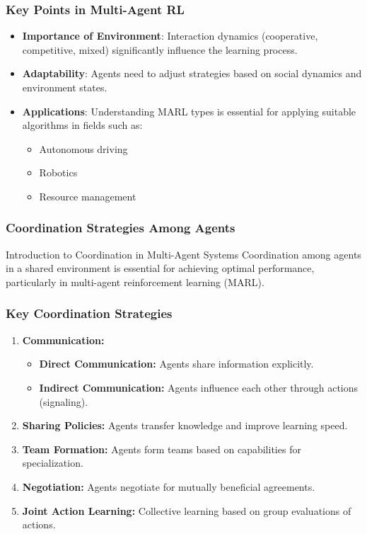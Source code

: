 \documentclass[aspectratio=169]{beamer}
\begin{document}
\begin{frame}[fragile]
    \frametitle{Key Points in Multi-Agent RL}
    \begin{itemize}
        \item \textbf{Importance of Environment}: Interaction dynamics (cooperative, competitive, mixed) significantly influence the learning process.
        \item \textbf{Adaptability}: Agents need to adjust strategies based on social dynamics and environment states.
        \item \textbf{Applications}: Understanding MARL types is essential for applying suitable algorithms in fields such as:
        \begin{itemize}
            \item Autonomous driving
            \item Robotics
            \item Resource management
        \end{itemize}
    \end{itemize}
\end{frame}

\begin{frame}[fragile]
    \frametitle{Coordination Strategies Among Agents}
    \begin{block}{Introduction to Coordination in Multi-Agent Systems}
        Coordination among agents in a shared environment is essential for achieving optimal performance, particularly in multi-agent reinforcement learning (MARL).
    \end{block}
\end{frame}

\begin{frame}[fragile]
    \frametitle{Key Coordination Strategies}
    \begin{enumerate}
        \item \textbf{Communication:}
            \begin{itemize}
                \item \textbf{Direct Communication:} Agents share information explicitly.
                \item \textbf{Indirect Communication:} Agents influence each other through actions (signaling).
            \end{itemize}
        \item \textbf{Sharing Policies:} Agents transfer knowledge and improve learning speed.
        \item \textbf{Team Formation:} Agents form teams based on capabilities for specialization.
        \item \textbf{Negotiation:} Agents negotiate for mutually beneficial agreements.
        \item \textbf{Joint Action Learning:} Collective learning based on group evaluations of actions.
    \end{enumerate}
\end{frame}
\end{document}

